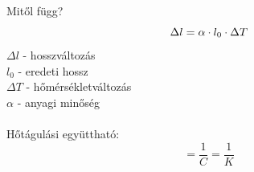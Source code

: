 \documentclass{article}
\theoremstyle{definition}
\begin{document}
Mitől függ?
\begin{equation}
    \Delta l = \alpha \cdot l_{0} \cdot \Delta T \\
\end{equation}
$\Delta l$ - hosszváltozás \\
$l_{0}$ - eredeti hossz \\
$\Delta T$ - hőmérsékletváltozás \\
$\alpha$ - anyagi minőség\\ \\
Hőtágulási együttható:
\begin{equation}
    [\alpha]=\frac{1}{C} = \frac{1}{K}
\end{equation}


\end{document}
